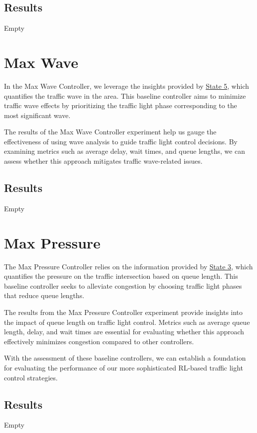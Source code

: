 \subsection{Results}
Empty 

\section{Max Wave}
In the Max Wave Controller, we leverage the insights provided by \hyperref[subsec:state-5]{State 5}, which quantifies the traffic wave in the area. This baseline controller aims to minimize traffic wave effects by prioritizing the traffic light phase corresponding to the most significant wave.

The results of the Max Wave Controller experiment help us gauge the effectiveness of using wave analysis to guide traffic light control decisions. By examining metrics such as average delay, wait times, and queue lengths, we can assess whether this approach mitigates traffic wave-related issues.

\subsection{Results}
Empty

\section{Max Pressure}
The Max Pressure Controller relies on the information provided by \hyperref[subsec:state-3]{State 3}, which quantifies the pressure on the traffic intersection based on queue length. This baseline controller seeks to alleviate congestion by choosing traffic light phases that reduce queue lengths.

The results from the Max Pressure Controller experiment provide insights into the impact of queue length on traffic light control. Metrics such as average queue length, delay, and wait times are essential for evaluating whether this approach effectively minimizes congestion compared to other controllers.

With the assessment of these baseline controllers, we can establish a foundation for evaluating the performance of our more sophisticated RL-based traffic light control strategies.

\subsection{Results}
Empty


